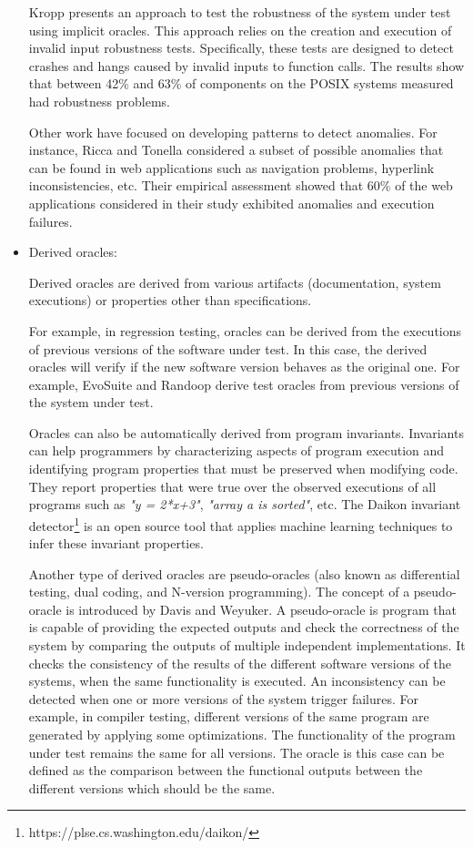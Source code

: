 \begin{itemize}
	Kropp \etal\cite{kropp1998automated} presents an approach to test the robustness of the system under test using implicit oracles.
	This approach relies on the creation and execution of invalid input robustness tests. Specifically, these tests are designed to detect crashes and hangs caused by invalid inputs to function calls. The results show that between 42\% and 63\% of components on the POSIX systems measured had robustness problems. 
	
	Other work have focused on developing patterns to detect anomalies. For instance, Ricca and Tonella\cite{ricca2006detecting} considered a subset of possible anomalies that can be found in web applications such as navigation problems, hyperlink inconsistencies, etc. Their empirical assessment
	showed that 60\% of the web applications considered in their study exhibited anomalies and execution failures.
	
	
	\item Derived oracles:
	
	Derived oracles are derived from various artifacts (\eg documentation, system executions) or properties other than specifications.
	
	For example, in regression testing, oracles can be derived from the executions of previous versions of the software under test. In this case, the derived oracles will verify if the new software version behaves as the original one\cite{mariani2007compatibility}. For example, EvoSuite and Randoop derive test oracles from previous versions of the system under test.
	
	Oracles can also be automatically derived from program invariants\cite{ernst2000quickly}. Invariants can help programmers by characterizing aspects of program execution and identifying program properties that must be preserved when modifying code. They report properties that were true over the observed executions of all programs such as \textit{"y = 2*x+3"}, \textit{"array a is sorted"}, etc. The Daikon invariant detector\footnote{https://plse.cs.washington.edu/daikon/} is an open source tool that applies machine learning techniques to infer these invariant properties.
	
	Another type of derived oracles are pseudo-oracles (also known as differential testing, dual coding, and N-version programming\cite{patrick2016testing}). 
	The concept of a pseudo-oracle is introduced by Davis and Weyuker\cite{davis1981pseudo}.
	A pseudo-oracle is program that is capable of providing the expected outputs and check the correctness of the system by comparing the outputs of multiple independent implementations. 
	It checks the consistency of the results of the different software versions of the systems, when the same functionality is executed. An inconsistency can be detected when one or more versions of the system trigger failures. 
	For example, in compiler testing, different versions of the same program are generated by applying some optimizations. The functionality of the program under test remains the same for all versions. The oracle is this case can be defined as the comparison between the functional outputs between the different versions which should be the same\cite{yang2011finding}.
	

\end{itemize}
